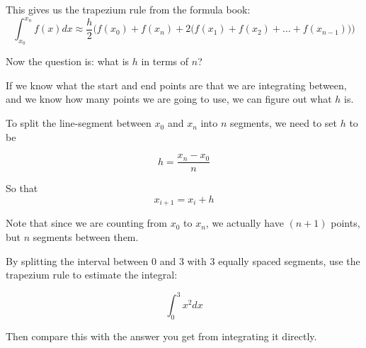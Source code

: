 This gives us the trapezium rule from the formula book:
\[ \int_{x_0}^{x_n}f(x) dx  \approx  \frac{h}{2} \bigg(  f(x_0) + f(x_n) + 2\big( f(x_{1})+ f(x_{2}) + \dots + f(x_{n-1})\big) \bigg) \]

Now the question is: what is $h$ in terms of $n$?

If we know what the start and end points are that we are integrating between, and we know how many points we are going to use, we can figure out what $h$ is.

To split the line-segment between 
$x_0$ and $x_n$ into $n$ segments, we need to set $h$ to be 

\[ h = \frac{x_n - x_0}{n}\]

So that 
\[ x_{i+1} = x_i + h \]

Note that since we are counting from $x_0$ to $x_n$, we actually have $(n+1)$ points, but $n$ segments between them.

\begin{example}
    By splitting the interval between $0$ and $3$ with $3$ equally spaced segments, use the trapezium rule to estimate the integral:

    \[ \int_0^3 x^2 dx\]

    Then compare this with the answer you get from integrating it directly.
\end{example}

